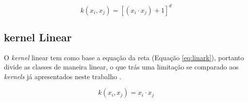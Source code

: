 \begin{equation}
  k( x_{i},  x_{j}) = [(x_{i} \cdot x_{j}) + 1]^d
  \label{eq:polinK}
\end{equation}


\subsection{kernel Linear}
O \textit{kernel} linear tem como base a equação da reta (Equação \ref{eq:linark}), portanto divide as classes de maneira linear, o que trás uma
limitação se comparado aos \textit{kernels} já apresentados neste trabalho \cite{Almeida_Carvalho_Menino_2020}.


\begin{equation}
  k( x_{i},  x_{j}) = x_{i} \cdot x_{j}
  \label{eq:linark}
\end{equation}

